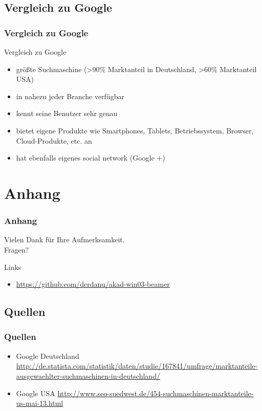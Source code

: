 \documentclass[xcolor=dvipsnames]{beamer}
\begin{document}
\subsection{Vergleich zu Google}
\begin{frame} %
  \frametitle{Vergleich zu Google} %
  \begin{block}{Vergleich zu Google}
	  \begin{itemize}
	  	\item größte Suchmaschine (>90\% Marktanteil in Deutschland, >60\% Marktanteil USA)
		\item in nahezu jeder Branche verfügbar
		\item kennt seine Benutzer sehr genau
		\item bietet eigene Produkte wie Smartphones, Tablets, Betriebssystem, Browser, Cloud-Produkte, etc. an
		\item hat ebenfalls eigenes social network (Google +)
	  \end{itemize}
  \end{block}
\end{frame}

\section{Anhang}
\begin{frame}
  \frametitle{Anhang} %
	\begin{block}{}	
		\begin{center}
			Vielen Dank für Ihre Aufmerksamkeit. \\
			Fragen?
		\end{center}	
	\end{block}
	\begin{block}{Links}	
		\begin{itemize}
			\item \url{https://github.com/derdanu/akad-win03-beamer}	
		\end{itemize}
	\end{block}
\end{frame}

\subsection{Quellen}
\begin{frame} %
  \frametitle{Quellen} %
 	\begin{itemize}
		\item Google Deutschland \url{http://de.statista.com/statistik/daten/studie/167841/umfrage/marktanteile-ausgewaehlter-suchmaschinen-in-deutschland/}
		\item Google USA \url{http://www.seo-suedwest.de/454-suchmaschinen-marktanteile-us-mai-13.html
}
	\end{itemize}
\end{frame}
\end{document}
